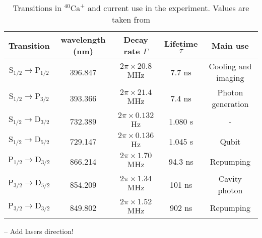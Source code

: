 \begin{table}[H]
\centering
\begin{tabular}{c c c c c}
 \toprule
    {Transition} & {wavelength (nm)} & {Decay rate $\Gamma$} & Lifetime $\tau$ & {Main use} \\ \midrule
   $\text{S}_{1/2} \to \text{P}_{1/2}$ & 396.847 & $2\pi \times 20.8$ MHz & 7.7 ns &  Cooling and imaging \\
    $\text{S}_{1/2} \to \text{P}_{3/2}$  & 393.366 & $2\pi \times 21.4$ MHz & 7.4 ns & Photon generation\\ \midrule
   $\text{S}_{1/2} \to \text{D}_{3/2}$ & 732.389 & $2\pi \times 0.132$ Hz & 1.080 s & - \\
    $\text{S}_{1/2} \to \text{D}_{5/2}$  & 729.147 & $2\pi \times 0.136$ Hz & 1.045 s   & Qubit  \\\midrule
    $\text{P}_{1/2} \to \text{D}_{3/2}$  & 866.214 &  $2\pi \times 1.70$ MHz  &  94.3 ns  & Repumping \\
    $\text{P}_{3/2} \to \text{D}_{5/2}$  & 854.209 & $2\pi \times 1.34$ MHz & 101 ns  & Cavity photon  \\
    $\text{P}_{3/2} \to \text{D}_{3/2}$  & 849.802 & $2\pi \times 1.52$ MHz  & 902 ns   & Repumping \\ \bottomrule
\end{tabular}
\caption{Transitions in $^{40}\text{Ca}^+$ and current use in the experiment. Values are taken from \cite{ion_spacing,stute}}
\label{transitiontable}
\end{table}

-- Add lasers direction!


